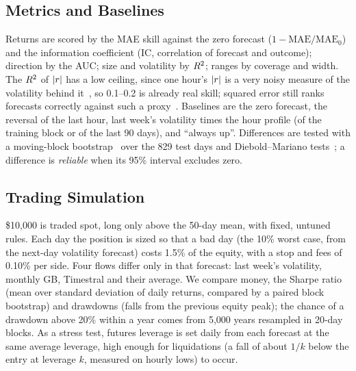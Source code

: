\subsection{Metrics and Baselines}
\label{sec:metrics}
Returns are scored by the MAE skill against the zero forecast
($1-\mathrm{MAE}/\mathrm{MAE}_0$) and the information coefficient (IC,
correlation of forecast and outcome); direction by the AUC; size and
volatility by $R^2$; ranges by coverage and width. The $R^2$ of
$|r|$ has a low ceiling, since one hour's $|r|$ is a very noisy
measure of the volatility behind it~\cite{andersen1998}, so 0.1--0.2 is
already real skill; squared error still ranks forecasts correctly
against such a proxy~\cite{patton2011}.
Baselines are the zero forecast, the reversal of the last hour, last
week's volatility times the hour profile (of the training block or of
the last 90 days), and ``always up''. Differences
are tested with a moving-block bootstrap~\cite{kunsch1989} over the 829
test days and Diebold--Mariano tests~\cite{diebold1995}; a difference is
\emph{reliable} when its 95\% interval excludes zero.

\subsection{Trading Simulation}
\label{sec:trading}
\$10{,}000 is traded spot, long only above the 50-day mean, with fixed,
untuned rules. Each day the position is sized so that a bad day (the
10\% worst case, from the next-day volatility forecast) costs 1.5\% of
the equity, with a stop and fees of 0.10\% per side. Four flows differ
only in that forecast: last week's volatility, monthly GB, Timestral and
their average. We compare money, the Sharpe ratio (mean over standard
deviation of daily returns, compared by a paired block bootstrap) and
drawdowns (falls from the previous equity peak); the chance of a
drawdown above 20\% within a year comes from 5{,}000 years resampled in
20-day blocks. As a stress test, futures leverage is set daily from each
forecast at the same average leverage, high enough for liquidations
(a fall of about $1/k$ below the entry at leverage $k$, measured on
hourly lows) to occur.